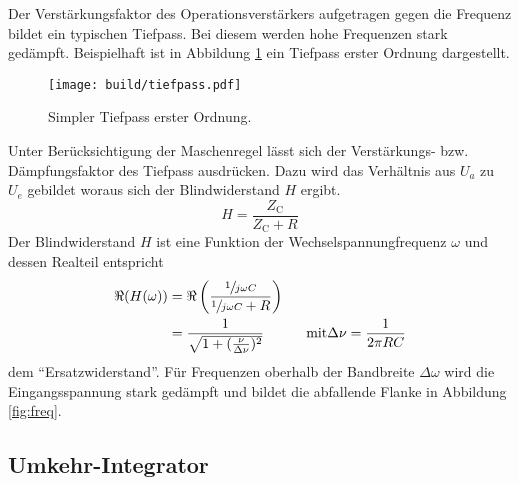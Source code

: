 Der Verstärkungsfaktor des Operationsverstärkers aufgetragen gegen die Frequenz bildet ein typischen Tiefpass.
Bei diesem werden hohe Frequenzen stark gedämpft.
Beispielhaft ist in Abbildung \ref{fig:tiefpass} ein Tiefpass erster Ordnung
dargestellt.
\begin{figure}[ht]
		\centering
		\texttt{[image: build/tiefpass.pdf]}
		\caption{Simpler Tiefpass erster Ordnung. \cite{wiki}}
		\label{fig:tiefpass}
\end{figure}
Unter Berücksichtigung der Maschenregel lässt sich der Verstärkungs- bzw.
Dämpfungsfaktor des Tiefpass ausdrücken.
Dazu wird das Verhältnis aus $U_a$ zu $U_e$ gebildet woraus sich der
Blindwiderstand $H$ ergibt.
\begin{equation}
		\label{eq:blindwiederstand}
		H = \frac{Z_\text{C}}{Z_\text{C} + R}
\end{equation}
Der Blindwiderstand $H$ ist eine Funktion der Wechselspannungfrequenz $\omega$
und dessen Realteil entspricht
\begin{align}
		\Re(H(\omega))  &= \Re \left(\frac{\sfrac{1}{j \omega C}}{\sfrac{1}{j\omega
		C} + R} \right) \nonumber \\
		&= \frac{1}{\sqrt{1 + (\frac{\nu}{\Delta \nu} )^2}} \,
		\hspace{1cm} \text{mit} \Delta \nu= \frac{1}{2 \pi RC}
		\label{eq:tiefpass}
\end{align}
dem \enquote{Ersatzwiderstand}.
Für Frequenzen oberhalb der Bandbreite $\Delta \omega$ wird die Eingangsspannung
stark gedämpft und bildet die abfallende Flanke in Abbildung \ref{fig:freq}.

\subsection{Umkehr-Integrator}%
\label{sub:umkehr_integrator}

